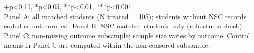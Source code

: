 \begin{table}[t]
\begin{minipage}{\linewidth}
+p\textless{}0.10, *p\textless{}0.05, **p\textless{}0.01, ***p\textless{}0.001\\
Panel A: all matched students (N treated = 105); students without NSC records coded as not enrolled. Panel B: NSC-matched students only (robustness check). Panel C: non-missing outcome subsample; sample size varies by outcome. Control means in Panel C are computed within the non-censored subsample.\\
\end{minipage}
\end{table}


